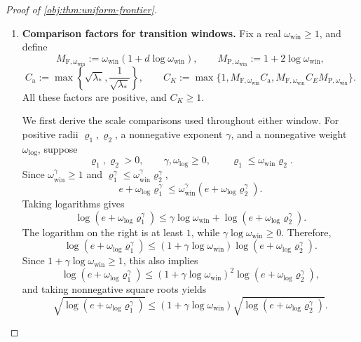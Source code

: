 \documentclass[11pt]{article}
\begin{document}
\begin{proof}[Proof of \cref{obj:thm:uniform-frontier}]
\begin{enumerate}
For \(n\ge n_0\), positivity of \(n\) and \(d\) gives the exact identities
\[
n a_n^d
=n(n^{-1/d})^d
=n n^{-1}=1,
\qquad
F_n(a_n)=\frac{a_n}{\sqrt{\lambda_*}}.
\]
The choices \(C\ge\sqrt{\lambda_*}\) and
\(C\ge1/\sqrt{\lambda_*}\) therefore imply
\[
D_n=a_n\le C F_n(a_n),
\qquad
F_n(a_n)\le C D_n.
\]
For every \(\sigma\in[0,1/4]\), nonnegativity of the branches in
\cref{obj:def:frontier-rate} gives \(\rho_{n,\sigma}\ge0\). Hence enlarging the upper-bound constants preserves their inequalities:
\[
c\rho_{n,\sigma}\le R_n(\sigma)
\le C_R\rho_{n,\sigma}\le C\rho_{n,\sigma},
\]
\[
c\rho_{n,\sigma}\le H_n(\sigma)
\le C_H\rho_{n,\sigma}\le C\rho_{n,\sigma}.
\]
Together with the second-threshold bounds, this establishes the first group of assertions with one \(C\) and one \(n_0\).

\item \textbf{Comparison factors for transition windows.}
Fix a real \(\omega_{\mathrm{win}}\ge1\), and define
\[
M_{\mathrm F,\omega_{\mathrm{win}}}:=\omega_{\mathrm{win}}(1+d\log \omega_{\mathrm{win}}),
\qquad
M_{\mathrm P,\omega_{\mathrm{win}}}:=1+2\log \omega_{\mathrm{win}},
\]
\[
C_{\mathrm a}:=\max\left\{\sqrt{\lambda_*},
\frac1{\sqrt{\lambda_*}}\right\},
\qquad
C_K:=\max\{1,M_{\mathrm F,\omega_{\mathrm{win}}}C_{\mathrm a},
M_{\mathrm F,\omega_{\mathrm{win}}}C_EM_{\mathrm P,\omega_{\mathrm{win}}}\}.
\]
All these factors are positive, and \(C_K\ge1\).

We first derive the scale comparisons used throughout either window. For positive radii \(\varrho_1,\varrho_2\), a nonnegative exponent \(\gamma\), and a nonnegative weight \(\omega_{\log}\), suppose
\[
\varrho_1,\varrho_2>0,\qquad
\gamma,\omega_{\log}\ge0,\qquad
\varrho_1\le \omega_{\mathrm{win}}\varrho_2.
\]
Since \(\omega_{\mathrm{win}}^\gamma\ge1\) and
\(\varrho_1^\gamma\le \omega_{\mathrm{win}}^\gamma\varrho_2^\gamma\),
\[
e+\omega_{\log}\varrho_1^\gamma
\le \omega_{\mathrm{win}}^\gamma(e+\omega_{\log}\varrho_2^\gamma).
\]
Taking logarithms gives
\[
\log(e+\omega_{\log}\varrho_1^\gamma)
\le\gamma\log \omega_{\mathrm{win}}+
\log(e+\omega_{\log}\varrho_2^\gamma).
\]
The logarithm on the right is at least \(1\), while
\(\gamma\log \omega_{\mathrm{win}}\ge0\). Therefore,
\[
\log(e+\omega_{\log}\varrho_1^\gamma)
\le
(1+\gamma\log \omega_{\mathrm{win}})
\log(e+\omega_{\log}\varrho_2^\gamma).
\]
Since \(1+\gamma\log \omega_{\mathrm{win}}\ge1\), this also implies
\[
\log(e+\omega_{\log}\varrho_1^\gamma)
\le
(1+\gamma\log \omega_{\mathrm{win}})^2
\log(e+\omega_{\log}\varrho_2^\gamma),
\]
and taking nonnegative square roots yields
\[
\sqrt{\log(e+\omega_{\log}\varrho_1^\gamma)}
\le
(1+\gamma\log \omega_{\mathrm{win}})
\sqrt{\log(e+\omega_{\log}\varrho_2^\gamma)}.
\]


\end{enumerate}
\end{proof}
\end{document}
